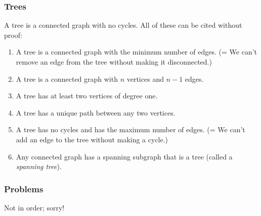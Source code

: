 \documentclass[11pt,paper=letter]{scrartcl}
\begin{document}
\subsubsection*{Trees}

A tree is a connected graph with no cycles. All of these can be cited without proof:

\begin{enumerate}
  \item A tree is a connected graph with the minimum number of edges. (= We can't remove an edge from the tree without making it disconnected.)
  \item A tree is a connected graph with $n$ vertices and $n-1$ edges.
  \item A tree has at least two vertices of degree one.
  \item A tree has a unique path between any two vertices.
  \item A tree has no cycles and has the maximum number of edges. (= We can't add an edge to the tree without making a cycle.)
  \item Any connected graph has a spanning subgraph that is a tree (called a \emph{spanning tree}).
\end{enumerate}

\subsubsection*{Problems}

Not in order; sorry!
\end{document}
